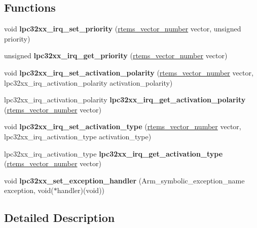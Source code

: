 \subsection*{Functions}
\begin{DoxyCompactItemize}
\item 
\mbox{\label{group__lpc32xx__interrupt_ga09c2d19f889e8e92f114e16ecef7507c}} 
void {\bfseries lpc32xx\+\_\+irq\+\_\+set\+\_\+priority} (\mbox{\hyperlink{group__ClassicINTR_ga3e434c197d99f128e78cae4d9358bd8b}{rtems\+\_\+vector\+\_\+number}} vector, unsigned priority)
\item 
\mbox{\label{group__lpc32xx__interrupt_ga3b72fafb5b3d513a9340c12275d0a85b}} 
unsigned {\bfseries lpc32xx\+\_\+irq\+\_\+get\+\_\+priority} (\mbox{\hyperlink{group__ClassicINTR_ga3e434c197d99f128e78cae4d9358bd8b}{rtems\+\_\+vector\+\_\+number}} vector)
\item 
\mbox{\label{group__lpc32xx__interrupt_ga74d3a7dd6385a20b3cdd2d210ca0a9f3}} 
void {\bfseries lpc32xx\+\_\+irq\+\_\+set\+\_\+activation\+\_\+polarity} (\mbox{\hyperlink{group__ClassicINTR_ga3e434c197d99f128e78cae4d9358bd8b}{rtems\+\_\+vector\+\_\+number}} vector, lpc32xx\+\_\+irq\+\_\+activation\+\_\+polarity activation\+\_\+polarity)
\item 
\mbox{\label{group__lpc32xx__interrupt_ga211c4741fa89f43b86ddcfa1f2be18e4}} 
lpc32xx\+\_\+irq\+\_\+activation\+\_\+polarity {\bfseries lpc32xx\+\_\+irq\+\_\+get\+\_\+activation\+\_\+polarity} (\mbox{\hyperlink{group__ClassicINTR_ga3e434c197d99f128e78cae4d9358bd8b}{rtems\+\_\+vector\+\_\+number}} vector)
\item 
\mbox{\label{group__lpc32xx__interrupt_ga34dbd53af7691d6532dea538a6e14dab}} 
void {\bfseries lpc32xx\+\_\+irq\+\_\+set\+\_\+activation\+\_\+type} (\mbox{\hyperlink{group__ClassicINTR_ga3e434c197d99f128e78cae4d9358bd8b}{rtems\+\_\+vector\+\_\+number}} vector, lpc32xx\+\_\+irq\+\_\+activation\+\_\+type activation\+\_\+type)
\item 
\mbox{\label{group__lpc32xx__interrupt_gabca106b26d6d8a7a37b37b8eec54cde6}} 
lpc32xx\+\_\+irq\+\_\+activation\+\_\+type {\bfseries lpc32xx\+\_\+irq\+\_\+get\+\_\+activation\+\_\+type} (\mbox{\hyperlink{group__ClassicINTR_ga3e434c197d99f128e78cae4d9358bd8b}{rtems\+\_\+vector\+\_\+number}} vector)
\item 
\mbox{\label{group__lpc32xx__interrupt_ga2b1f04003410df947ae7f152e2308d8d}} 
void {\bfseries lpc32xx\+\_\+set\+\_\+exception\+\_\+handler} (Arm\+\_\+symbolic\+\_\+exception\+\_\+name exception, void($\ast$handler)(void))
\end{DoxyCompactItemize}


\subsection{Detailed Description}
